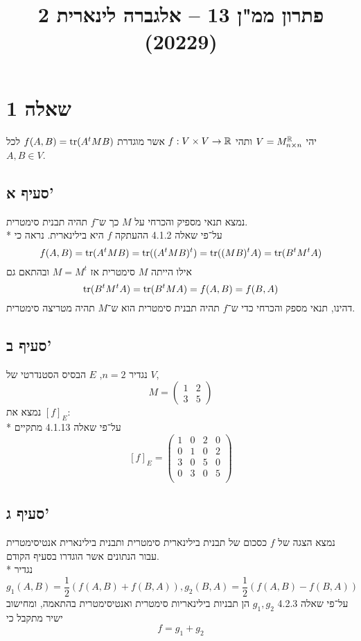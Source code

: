 

\title{פתרון ממ"ן 13 – אלגברה לינארית 2 (20229)}


\maketitle

\section{שאלה 1}
יהי $V = M_{n \times n}^{\mathbb{R}}$ ותהי $f: V \times V \to \mathbb{R}$ אשר מוגדרת $f(A, B) = \operatorname{tr}(A^t M B)$ לכל $A, B \in V$.

\subsection{סעיף א'}
נמצא תנאי מספיק והכרחי על $M$ כך ש־$f$ תהיה תבנית סימטרית. \\*
על־פי שאלה 4.1.2 ההעתקה $f$ היא בילינארית. נראה כי
\[
	f(A, B) = \operatorname{tr}(A^t M B) = \operatorname{tr}( (A^t M B)^t ) = \operatorname{tr}( (M B)^t A) = \operatorname{tr}( B^t M^t A)
\]
אילו הייתה $M$ סימטרית אז $M = M^t$ ובהתאם גם
\[
	\operatorname{tr}(B^t M^t A) = \operatorname{tr}( B^t M A) = f(A, B) = f(B, A)
\]
דהינו, תנאי מספק והכרחי כדי ש־$f$ תהיה תבנית סימטרית הוא ש־$M$ תהיה מטריצה סימטרית.

\subsection{סעיף ב'}
נגדיר $n = 2$, $E$ הבסיס הסטנדרטי של $V$,
\[
	M = \begin{pmatrix}
		1 & 2 \\
		3 & 5
	\end{pmatrix}
\]
נמצא את $[f]_E$: \\*
על־פי שאלה 4.1.13 מתקיים
\[
	[f]_E = \begin{pmatrix}
		1 & 0 & 2 & 0 \\
		0 & 1 & 0 & 2 \\
		3 & 0 & 5 & 0 \\
		0 & 3 & 0 & 5 \\
	\end{pmatrix}
\]

\subsection{סעיף ג'}
נמצא הצגה של $f$ כסכום של תבנית בילינארית סימטרית ותבנית בילינארית אנטיסימטרית עבור הנתונים אשר הוגדרו בסעיף הקודם. \\*
נגדיר
\[
	g_1(A, B) = \frac{1}{2} (f(A, B) + f(B, A)), g_2(B, A) = \frac{1}{2}(f(A, B) - f(B, A))
\]
על־פי שאלה 4.2.3 $g_1, g_2$ הן תבניות בילינאריות סימטרית ואנטיסימטרית בהתאמה, ומחישוב ישיר מתקבל כי
\[
	f = g_1 + g_2
\]

